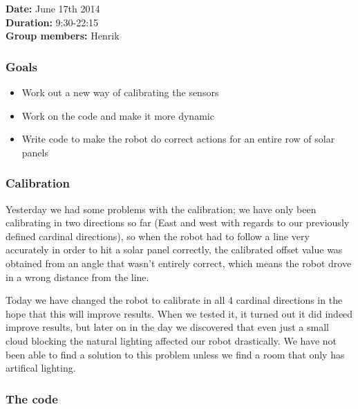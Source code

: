 \textbf{Date:} June 17th 2014\\\textbf{Duration:}
9:30-22:15\\\textbf{Group members:} Henrik

\subsubsection{Goals}

\begin{itemize}
\itemsep1pt\parskip0pt
\item
  Work out a new way of calibrating the sensors
\item
  Work on the code and make it more dynamic
\item
  Write code to make the robot do correct actions for an entire row of
  solar panels
\end{itemize}

\subsubsection{Calibration}

Yesterday we had some problems with the calibration; we have only been
calibrating in two directions so far (East and west with regards to our
previously defined cardinal directions), so when the robot had to follow
a line very accurately in order to hit a solar panel correctly, the
calibrated offset value was obtained from an angle that wasn't entirely
correct, which means the robot drove in a wrong distance from the line.

Today we have changed the robot to calibrate in all 4 cardinal
directions in the hope that this will improve results. When we tested
it, it turned out it did indeed improve results, but later on in the day
we discovered that even just a small cloud blocking the natural lighting
affected our robot drastically. We have not been able to find a solution
to this problem unless we find a room that only has artifical lighting.

\subsubsection{The code}


